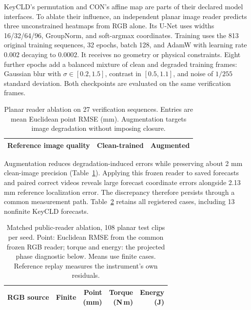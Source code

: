 \documentclass[10pt,twocolumn,letterpaper]{article}
\begin{document}
KeyCLD's permutation and CON's affine map are parts of their declared model interfaces. To ablate their influence, an independent planar image reader predicts three unconstrained heatmaps from RGB alone. Its U-Net uses widths 16/32/64/96, GroupNorm, and soft-argmax coordinates. Training uses the 813 original training sequences, 32 epochs, batch 128, and AdamW with learning rate $0.002$ decaying to $0.0002$. It receives no geometry or physical constraints. Eight further epochs add a balanced mixture of clean and degraded training frames: Gaussian blur with $\sigma\in[0.2,1.5]$, contrast in $[0.5,1.1]$, and noise of $1/255$ standard deviation. Both checkpoints are evaluated on the same verification frames.

\begin{table}[t]
\caption{Planar reader ablation on 27 verification sequences. Entries are mean Euclidean point RMSE (mm). Augmentation targets image degradation without imposing closure.}
\label{app:reader-quality}
\centering\small
\begin{tabular}{lrr}
\toprule
Reference image quality & Clean-trained & Augmented\\
\midrule

\bottomrule
\end{tabular}
\end{table}

Augmentation reduces degradation-induced errors while preserving about 2 mm clean-image precision (Table~\ref{app:reader-quality}). Applying this frozen reader to saved forecasts and paired correct videos reveals large forecast coordinate errors alongside 2.13 mm reference localization error. The discrepancy therefore persists through a common measurement path. Table~\ref{app:reader-paired} retains all registered cases, including 13 nonfinite KeyCLD forecasts.

\begin{table}[t]
\caption{Matched public-reader ablation, 108 planar test clips per seed. Point: Euclidean RMSE from the common frozen RGB reader; torque and energy: the projected phase diagnostic below. Means use finite cases. Reference replay measures the instrument's own residuals.}
\label{app:reader-paired}
\centering\small
\setlength{\tabcolsep}{3pt}
\begin{tabular}{lrrrr}
\toprule
RGB source & Finite & \shortstack{Point\\(mm)} & \shortstack{Torque\\(N\,m)} & \shortstack{Energy\\(J)}\\
\midrule

\bottomrule
\end{tabular}
\end{table}
\end{document}
